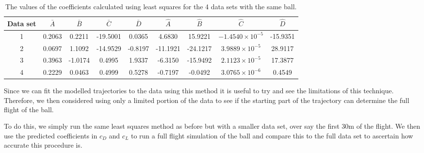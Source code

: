 \begin{table}
\footnotesize
\centering
\begin{tabular}{c| c c c c c c c c}
Data set & $\bar{A}$ & $\bar{B}$ & $\bar{C}$ & $\bar{D}$ & $\hat{A}$ & $\hat{B}$ & $\hat{C}$ & $\hat{D}$ \\
\hline
1 & 0.2063 & 0.2211 & -19.5001 & 0.0365 & 4.6830 & 15.9221 & $-1.4540\times10^{-5}$ & -15.9351 \\
2 & 0.0697 & 1.1092 & -14.9529 & -0.8197 & -11.1921 & -24.1217 & $3.9889\times10^{-5}$ & 28.9117 \\
3 & 0.3963 & -1.0174 & 0.4995 & 1.9337 & -6.3150 & -15.9492 & $2.1123\times10^{-5}$ & 17.3877 \\
4 & 0.2229 & 0.0463 & 0.4999 & 0.5278 & -0.7197 & -0.0492 & $3.0765\times10^{-6}$ & 0.4549
\end{tabular} 
\caption[Table of coefficients calculated by the least squares method]{The values of the coefficients 
calculated using least squares for the 4 data sets with the same ball.
}
\label{ls-table}
\end{table}

Since we can fit the modelled trajectories to the data using this method it is useful to try and see
the limitations of this technique. Therefore, we then considered using only a limited portion of 
the data to see if the starting part of the trajectory can determine the full flight of the ball.

To do this, we simply run the same least squares method as before but with a smaller data set, over
say the first 30m of the flight. We then use the predicted coefficients in $c_D$ and $c_L$ to run a
full flight simulation of the ball and compare this to the full data set to ascertain how accurate this
procedure is.

